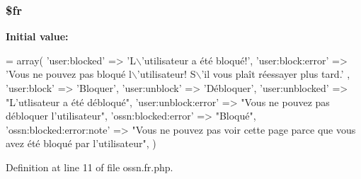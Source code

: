 \subsubsection[{\texorpdfstring{\$fr}{$fr}}]{\setlength{\rightskip}{0pt plus 5cm}\$fr}\hypertarget{components_2_ossn_block_2locale_2ossn_8fr_8php_ad5107c697816e7b7f89ad1b3e94e3e0e}{}\label{components_2_ossn_block_2locale_2ossn_8fr_8php_ad5107c697816e7b7f89ad1b3e94e3e0e}
{\bfseries Initial value\+:}
\begin{DoxyCode}
= array(
    \textcolor{stringliteral}{'user:blocked'} => \textcolor{stringliteral}{'L\(\backslash\)'utilisateur a été bloqué!'},
    \textcolor{stringliteral}{'user:block:error'} => \textcolor{stringliteral}{'Vous ne pouvez pas bloqué l\(\backslash\)'utilisateur! S\(\backslash\)'il vous plaît réessayer plus tard.'}
      ,
    \textcolor{stringliteral}{'user:block'} => \textcolor{stringliteral}{'Bloquer'},
    \textcolor{stringliteral}{'user:unblock'} => \textcolor{stringliteral}{'Débloquer'},
    \textcolor{stringliteral}{'user:unblocked'} => \textcolor{stringliteral}{"L'utlisateur a été débloqué"},
    \textcolor{stringliteral}{'user:unblock:error'} => \textcolor{stringliteral}{"Vous ne pouvez pas débloquer l'utilisateur"},
    \textcolor{stringliteral}{'ossn:blocked:error'} => \textcolor{stringliteral}{"Bloqué"},
    \textcolor{stringliteral}{'ossn:blocked:error:note'} => \textcolor{stringliteral}{"Vous ne pouvez pas voir cette page parce que vous avez été bloqué par
       l'utilisateur"}, 
)
\end{DoxyCode}


Definition at line 11 of file ossn.\+fr.\+php.

